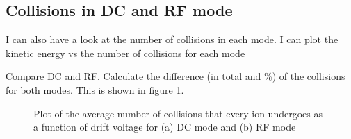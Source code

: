 \subsection{Collisions in DC and RF mode}
I can also have a look at the number of collisions in each mode.
I can plot the kinetic energy vs the number of collisions for each mode


Compare DC and RF. Calculate the difference (in total and \%) of the collisions for both modes. This is shown in figure \ref{fig:col}.









\begin{figure}%
\begin{center}

\bigskip
{}
\end{center}
\caption{Plot of the average number of collisions that every ion undergoes as a function of drift voltage for (a) DC mode and (b) RF mode }\label{fig:col}
\end{figure}













